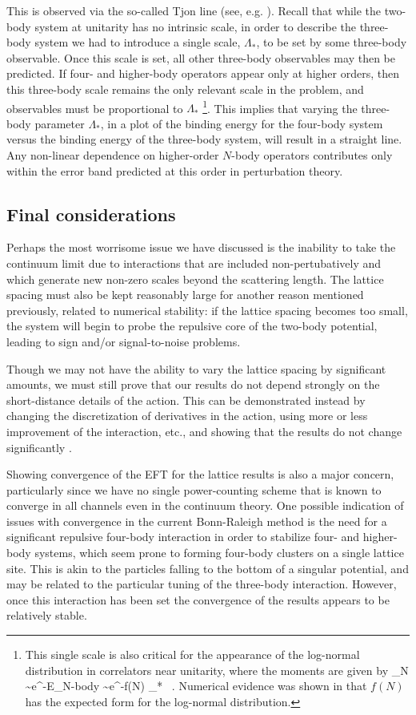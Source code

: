 This is observed via the so-called Tjon line (see, e.g. \cite{Hammer:2010kp}). Recall that while the two-body system at unitarity has no intrinsic scale, in order to describe the three-body system we had to introduce a single scale, $\Lambda_{*}$, to be set by some three-body observable. Once this scale is set, all other three-body observables may then be predicted. If four- and higher-body operators appear only at higher orders, then this three-body scale remains the only relevant scale in the problem, and observables must be proportional to $\Lambda_{*}$ \footnote{This single scale is also critical for the appearance of the log-normal distribution in correlators near unitarity, where the moments are given by
\beq
\calM_N \sim e^{-E_{\mbox{\tiny N-body}}\tau} \sim e^{-f(N) \Lambda_{*} \tau} \ .
\eeq
Numerical evidence was shown in \cite{Nicholson:2012zp} that $f(N)$ has the expected form for the log-normal distribution.}. This implies that varying the three-body parameter $\Lambda_{*}$, in a plot of the binding energy for the four-body system versus the binding energy of the three-body system, will result in a straight line. Any non-linear dependence on higher-order $N$-body operators contributes only within the error band predicted at this order in perturbation theory.

\subsection{\label{conclusions}Final considerations}
Perhaps the most worrisome issue we have discussed is the inability to take the continuum limit due to interactions that are included non-pertubatively and which generate new non-zero scales beyond the scattering length. The lattice spacing must also be kept reasonably large for another reason mentioned previously, related to numerical stability: if the lattice spacing becomes too small, the system will begin to probe the repulsive core of the two-body potential, leading to sign and/or signal-to-noise problems. 

Though we may not have the ability to vary the lattice spacing by significant amounts, we must still prove that our results do not depend strongly on the short-distance details of the action. This can be demonstrated instead by changing the discretization of derivatives in the action, using more or less improvement of the interaction, etc., and showing that the results do not change significantly \cite{Lee:2008fa}. 

Showing convergence of the EFT for the lattice results is also a major concern, particularly since we have no single power-counting scheme that is known to converge in all channels even in the continuum theory. One possible indication of issues with convergence in the current Bonn-Raleigh method is the need for a significant repulsive four-body interaction in order to stabilize four- and higher-body systems, which seem prone to forming four-body clusters on a single lattice site. This is akin to the particles falling to the bottom of a singular potential, and may be related to the particular tuning of the three-body interaction. However, once this interaction has been set the convergence of the results appears to be relatively stable.


